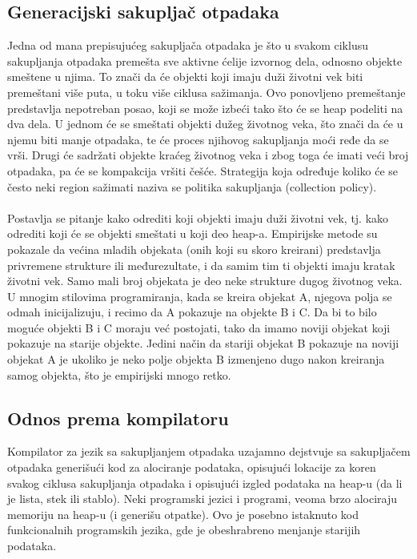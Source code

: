 \subsection{Generacijski sakupljač otpadaka}
Jedna od mana prepisujućeg sakupljača otpadaka je što u svakom ciklusu
sakupljanja otpadaka premešta sve aktivne ćelije izvornog dela, odnosno objekte smeštene u njima.
To znači da će objekti koji imaju duži životni vek biti premeštani više puta, u toku više ciklusa sažimanja.
Ovo ponovljeno premeštanje predstavlja nepotreban posao, koji se može izbeći tako što će se heap podeliti na dva dela.
U jednom će se smeštati objekti dužeg životnog veka, što znači da će u njemu biti manje otpadaka, te će proces njihovog sakupljanja moći ređe da se vrši.
Drugi će sadržati objekte kraćeg životnog veka i zbog toga će imati veći broj otpadaka, pa će se kompakcija vršiti češće.
Strategija koja određuje koliko će se često neki region sažimati naziva se politika sakupljanja (collection policy).
\\
\\
Postavlja se pitanje kako odrediti koji objekti imaju duži životni vek, tj. kako odrediti koji će se objekti smeštati u koji deo heap-a. 
Empirijske metode su pokazale da većina mladih objekata (onih koji su skoro kreirani) predstavlja privremene strukture ili međurezultate, i da samim tim ti objekti imaju kratak životni vek.
Samo mali broj objekata je deo neke strukture dugog životnog veka.
U mnogim stilovima programiranja, kada se kreira objekat A, njegova polja se odmah inicijalizuju, i recimo da A pokazuje na objekte B i C.
Da bi to bilo moguće objekti B i C moraju već postojati, tako da imamo noviji objekat koji pokazuje na starije objekte.
Jedini način da stariji objekat B pokazuje na noviji objekat A je ukoliko je neko polje objekta B izmenjeno dugo nakon kreiranja samog objekta, što je empirijski mnogo retko.

\subsection{Odnos prema kompilatoru}

Kompilator za jezik sa sakupljanjem otpadaka uzajamno dejstvuje sa sakupljačem otpadaka generišući kod za alociranje podataka, opisujući lokacije za koren svakog ciklusa sakupljanja otpadaka i opisujući izgled podataka na heap-u (da li je lista, stek ili stablo).
Neki programski jezici i programi, veoma brzo alociraju memoriju na heap-u (i generišu otpatke).
Ovo je posebno istaknuto kod funkcionalnih programskih jezika, gde je obeshrabreno menjanje starijih podataka.





